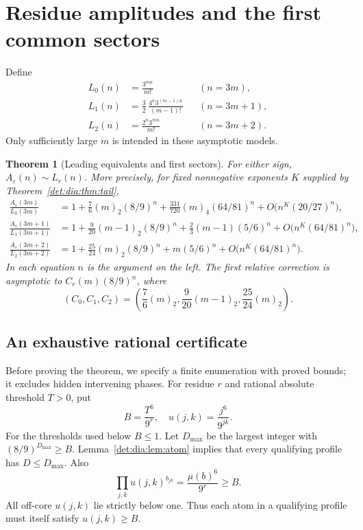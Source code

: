 \documentclass[11pt,letterpaper]{article}
\numberwithin{equation}{section}
\newtheorem{theorem}{Theorem}[section]
\theoremstyle{definition}\newtheorem{definition}[theorem]{Definition}
\theoremstyle{remark}\newtheorem{remark}[theorem]{Remark}
\newcommand{\fall}[2]{(#1)_{\underline{#2}}}
\newcommand{\eps}{\varepsilon}
\begin{document}
\section{Residue amplitudes and the first common sectors}
Define
\begin{equation}\label{det:dia:eq:L}
\begin{aligned}
 L_0(n)&=\frac{3^{mn}}{m!}&& (n=3m),\\
 L_1(n)&=\frac32\,\frac{4^n3^{(m-1)n}}{(m-1)!}&& (n=3m+1),\\
 L_2(n)&=\frac{2^n3^{mn}}{m!}&& (n=3m+2).
\end{aligned}
\end{equation}
Only sufficiently large $m$ is intended in these asymptotic models.

\begin{theorem}[Leading equivalents and first sectors]\label{det:dia:thm:sectors}
For either sign, $A_\eps(n)\sim L_r(n)$. More precisely, for fixed
nonnegative exponents $K$ supplied by Theorem~\ref{det:dia:thm:tail},
\begin{align}
 \frac{A_\eps(3m)}{L_0(3m)}
 &=1+\frac76\fall{m}{2}(8/9)^n
 +\frac{331}{720}\fall{m}{4}(64/81)^n
 +O\bigl(n^K(20/27)^n\bigr),\label{det:dia:eq:sector0}\\
 \frac{A_\eps(3m+1)}{L_1(3m+1)}
 &=1+\frac9{20}\fall{m-1}{2}(8/9)^n
 +\frac23(m-1)(5/6)^n
 +O\bigl(n^K(64/81)^n\bigr),\label{det:dia:eq:sector1}\\
 \frac{A_\eps(3m+2)}{L_2(3m+2)}
 &=1+\frac{25}{24}\fall{m}{2}(8/9)^n
 +m(5/6)^n
 +O\bigl(n^K(64/81)^n\bigr).\label{det:dia:eq:sector2}
\end{align}
In each equation $n$ is the argument on the left. The first relative
correction is asymptotic to $C_r(m)(8/9)^n$, where
\begin{equation}\label{det:dia:eq:C}
 (C_0,C_1,C_2)=
 \left(\frac76\fall{m}{2},\frac9{20}\fall{m-1}{2},
 \frac{25}{24}\fall{m}{2}\right).
\end{equation}
\end{theorem}

\subsection{An exhaustive rational certificate}
Before proving the theorem, we specify a finite enumeration with proved
bounds; it excludes hidden intervening phases. For residue $r$ and
rational absolute threshold $T>0$, put
\begin{equation}\label{det:dia:eq:boundB}
 B=\frac{T^6}{9^r},\quad
 u(j,k)=\frac{j^6}{9^{jk}}.
\end{equation}
For the thresholds used below $B\leq1$. Let $D_{\max}$ be the largest
integer with $(8/9)^{D_{\max}}\geq B$. Lemma~\ref{det:dia:lem:atom} implies
that every qualifying profile has $D\leq D_{\max}$. Also
\begin{equation}\label{det:dia:eq:weightproduct}
 \prod_{j,k}u(j,k)^{b_{jk}}=\frac{\mu(b)^6}{9^r}\geq B.
\end{equation}
All off-core $u(j,k)$ lie strictly below one. Thus each atom in a
qualifying profile must itself satisfy $u(j,k)\geq B$.
\end{document}
